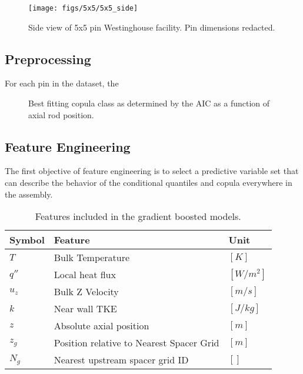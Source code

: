 \begin{figure}[H]
    \centering
    \texttt{[image: figs/5x5/5x5\_side]}
    \caption[Side view of 5x5 pin Westinghouse facility.]{Side view of 5x5 pin Westinghouse facility.  Pin dimensions redacted.}
    \label{fig:5x5side}
\end{figure}


\subsection{Preprocessing}
For each pin in the dataset, the 
\begin{figure}[H]%
    \centering
    \qquad
    \qquad
    \qquad
    \qquad
    \caption[Best fitting copula to CFD data.]{Best fitting copula class as determined by the AIC as a function of axial rod position.}%
    \label{fig:copula_predicted}%
\end{figure}


\subsection{Feature Engineering}

The first objective of feature engineering is to select a predictive variable set that can describe the behavior of the conditional quantiles and copula everywhere in the assembly.
   
\begin{table}[h]
    \begin{center}
    \caption[Included features.]{Features included in the gradient boosted models.}
\begin{tabular}[h]{|l | l | l |}
    \hline
    Symbol & Feature & Unit \\
    \hline
    $T$ & Bulk Temperature  &  $[K]$ \\
    $q''$ & Local heat flux & $[W/m^2]$ \\
    $u_z$ & Bulk Z Velocity &  $[m/s]$ \\
    $k$ & Near wall TKE &  $[J/kg]$ \\
    $z$ & Absolute axial position & $[m]$ \\
    $z_g$ & Position relative to Nearest Spacer Grid & $[m]$ \\
    $N_g$ & Nearest upstream spacer grid ID & $[]$ \\
    \hline
\end{tabular}
\label{tab:features}
\end{center}
\end{table}

